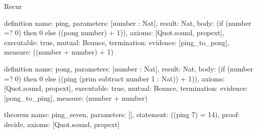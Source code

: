 \begin{lexlean}{Recur}
\begin{semanticmodule}
definition{
  name: ping,
  parameters: [number : Nat],
  result: Nat,
  body: (if (number =? 0) then 0 else ((pong number) + 1)),
  axioms: [Quot.sound, propext],
  executable: true,
  mutual: Bounce,
  termination: {evidence: [ping_to_pong], measure: ((number + number) + 1)}
}

definition{
  name: pong,
  parameters: [number : Nat],
  result: Nat,
  body: (if (number =? 0) then 0 else ((ping (prim subtract number 1 : Nat)) + 1)),
  axioms: [Quot.sound, propext],
  executable: true,
  mutual: Bounce,
  termination: {evidence: [pong_to_ping], measure: (number + number)}
}

theorem{
  name: ping_seven,
  parameters: [],
  statement: ((ping 7) = 14),
  proof: decide{},
  axioms: [Quot.sound, propext]
}
\end{semanticmodule}
\end{lexlean}
